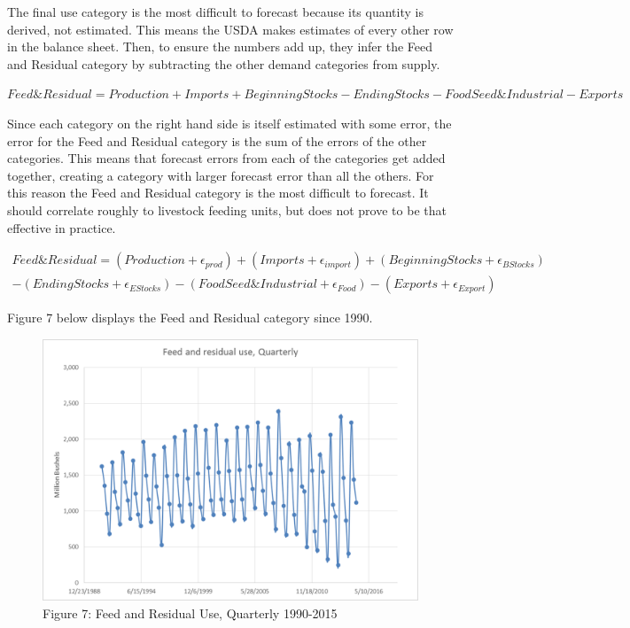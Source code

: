 \documentclass[]{book}
\theoremstyle{definition}
\theoremstyle{definition}
\theoremstyle{remark}
\begin{document}
The final use category is the most difficult to forecast because its
quantity is derived, not estimated. This means the USDA makes estimates
of every other row in the balance sheet. Then, to ensure the numbers add
up, they infer the Feed and Residual category by subtracting the other
demand categories from supply.

\(Feed\&Residual = Production + Imports + Beginning Stocks - Ending Stocks - FoodSeed\&Industrial - Exports\)

Since each category on the right hand side is itself estimated with some
error, the error for the Feed and Residual category is the sum of the
errors of the other categories. This means that forecast errors from
each of the categories get added together, creating a category with
larger forecast error than all the others. For this reason the Feed and
Residual category is the most difficult to forecast. It should correlate
roughly to livestock feeding units, but does not prove to be that
effective in practice.

\(\begin{align} Feed\&Residual = (Production + \epsilon_{prod}) + (Imports + \epsilon_{import}) + (Beginning Stocks + \epsilon_{BStocks}) \\ - (Ending Stocks + \epsilon_{EStocks}) - (FoodSeed\&Industrial + \epsilon_{Food}) - (Exports + \epsilon_{Export}) \end{align}\)

Figure 7 below displays the Feed and Residual category since 1990.

\begin{figure}[htbp]
\centering
\includegraphics{Excel-files/IntroductiontoCommodityTS-FeedGrains_Corn_files/image019.png}
\caption{Figure 7: Feed and Residual Use, Quarterly 1990-2015}
\end{figure}
\end{document}
